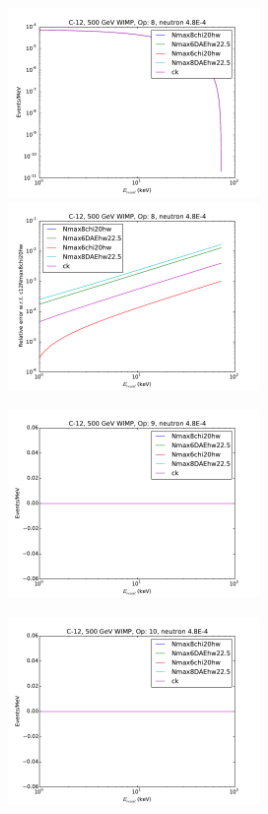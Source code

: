 \documentclass{article}
\begin{document}
\includegraphics[width=0.5\textwidth]{c12-o8}
\includegraphics[width=0.5\textwidth]{c12-o8-relerr}

\includegraphics[width=0.5\textwidth]{c12-o9}

\includegraphics[width=0.5\textwidth]{c12-o10}
\end{document}
